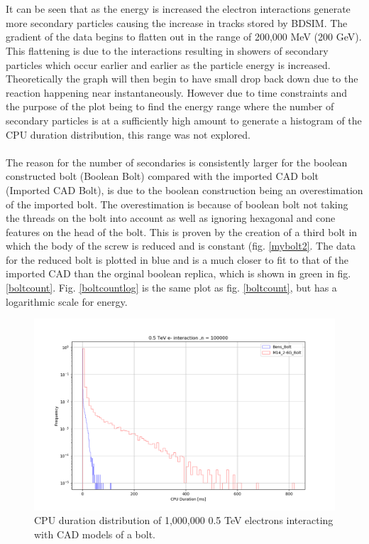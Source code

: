 \documentclass[12pt,a4paper]{article}
\begin{document}
\\\\
\noindent It can be seen that as the energy is increased the electron interactions generate more secondary particles causing the increase in tracks stored by BDSIM. The gradient of the data begins to flatten out in the range of 200,000 MeV (200 GeV). This flattening is due to the interactions resulting in showers of secondary particles which occur earlier and earlier as the particle energy is increased. Theoretically the graph will then begin to have small drop back down due to the reaction happening near instantaneously. However due to time constraints and the purpose of the plot being to find the energy range where the number of secondary particles is at a sufficiently high amount to generate a histogram of the CPU duration distribution, this range was not explored.
\\\\
\noindent The reason for the number of secondaries is consistently larger for the boolean constructed bolt (Boolean Bolt) compared with the imported CAD bolt (Imported CAD Bolt), is due to the boolean construction being an overestimation of the imported bolt. The overestimation is because of boolean bolt not taking the threads on the bolt into account as well as ignoring hexagonal and cone features on the head of the bolt. This is proven by the creation of a third bolt in which the body of the screw is reduced and is constant (fig. \ref{mybolt2}. The data for the reduced bolt is plotted in blue and is a much closer to fit to that of the imported CAD than the orginal boolean replica, which is shown in green in fig. \ref{boltcount}. Fig. \ref{boltcountlog} is the same plot as fig. \ref{boltcount}, but has a logarithmic scale for energy.

\begin{figure}[h!]
\centering
\includegraphics[scale=0.5]{Images//CAD_Screw//cpudist1.png}
\caption[width=\columnwidth]{CPU duration distribution of 1,000,000 0.5 TeV electrons interacting with CAD models of a bolt.}
\label{lastplot}
\end{figure}
\end{document}
